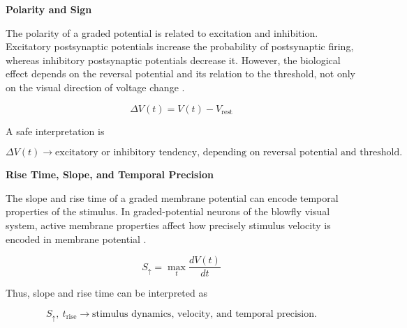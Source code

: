 \documentclass{book}
\providecommand{\ProjectDeepHeading}[2]{%
    \par\medskip\noindent\textbf{#2}\par\smallskip
}
\begin{document}
        \ProjectDeepHeading{13}{Polarity and Sign}
            
            The polarity of a graded potential is related to excitation and inhibition. Excitatory postsynaptic potentials increase the probability of postsynaptic firing, whereas inhibitory postsynaptic potentials decrease it. However, the biological effect depends on the reversal potential and its relation to the threshold, not only on the visual direction of voltage change \citep{purves-2001-excitatory-and-inhibitory-postsynaptic-potentials,purves-2001-summation-of-synaptic-potentials}.
            
            \begin{equation}
                \ensuremath{\Delta} V(t)
                =
                V(t)-V_{\mathrm{rest}}
            \end{equation}
            
            A safe interpretation is
            
            \begin{equation}
                \ensuremath{\Delta} V(t)
                \rightarrow
                \text{excitatory or inhibitory tendency, depending on reversal potential and threshold}.
            \end{equation}
        
        \ProjectDeepHeading{13}{Rise Time, Slope, and Temporal Precision}
            
            The slope and rise time of a graded membrane potential can encode temporal properties of the stimulus. In graded-potential neurons of the blowfly visual system, active membrane properties affect how precisely stimulus velocity is encoded in membrane potential \citep{haag-1998-active-membrane-properties-and-signal-encoding-in-graded-potential-neurons}.
            
            \begin{equation}
                S_{\uparrow}
                =
                \max_t \frac{dV(t)}{dt}
            \end{equation}
            
            Thus, slope and rise time can be interpreted as
            
            \begin{equation}
                S_{\uparrow},\ t_{\mathrm{rise}}
                \rightarrow
                \text{stimulus dynamics, velocity, and temporal precision}.
            \end{equation}
        
\end{document}
